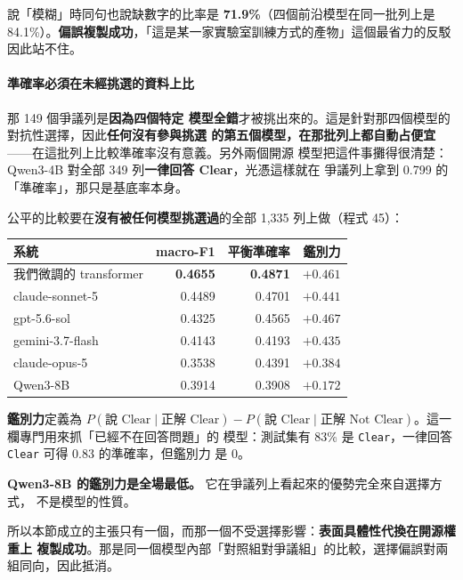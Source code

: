 \documentclass[11pt,a4paper]{ctexart}
\newcommand{\fn}[1]{\texttt{#1}}
\begin{document}
說「模糊」時同句也說缺數字的比率是 \textbf{71.9\%}（四個前沿模型在同一批列上是
84.1\%）。\textbf{偏誤複製成功}，「這是某一家實驗室訓練方式的產物」這個最省力的反駁
因此站不住。

\paragraph{準確率必須在未經挑選的資料上比} 那 149 個爭議列是\textbf{因為四個特定
模型全錯}才被挑出來的。這是針對那四個模型的對抗性選擇，因此\textbf{任何沒有參與挑選
的第五個模型，在那批列上都自動占便宜}——在這批列上比較準確率沒有意義。另外兩個開源
模型把這件事攤得很清楚：Qwen3-4B 對全部 349 列\textbf{一律回答 Clear}，光憑這樣就在
爭議列上拿到 0.799 的「準確率」，那只是基底率本身。

\medskip
公平的比較要在\textbf{沒有被任何模型挑選過}的全部 1{,}335 列上做（程式 45）：

\medskip
\begin{tabular}{@{}lrrr@{}}
\toprule
系統 & macro-F1 & 平衡準確率 & 鑑別力 \\
\midrule
\rowcolor{green!12}
我們微調的 transformer & \textbf{0.4655} & \textbf{0.4871} & $+0.461$ \\
claude-sonnet-5 & 0.4489 & 0.4701 & $+0.441$ \\
gpt-5.6-sol & 0.4325 & 0.4565 & $+0.467$ \\
gemini-3.7-flash & 0.4143 & 0.4193 & $+0.435$ \\
claude-opus-5 & 0.3538 & 0.4391 & $+0.384$ \\
\rowcolor{yellow!15}
Qwen3-8B & 0.3914 & 0.3908 & $\mathbf{+0.172}$ \\
\bottomrule
\end{tabular}

\medskip
\textbf{鑑別力}定義為 $P(\text{說 Clear} \mid \text{正解 Clear}) -
P(\text{說 Clear} \mid \text{正解 Not Clear})$。這一欄專門用來抓「已經不在回答問題」的
模型：測試集有 83\% 是 \fn{Clear}，一律回答 \fn{Clear} 可得 0.83 的準確率，但鑑別力
是 0。

\medskip
\begin{tcolorbox}[colback=gray!8, colframe=gray!55]
\textbf{Qwen3-8B 的鑑別力是全場最低。} 它在爭議列上看起來的優勢完全來自選擇方式，
不是模型的性質。

\medskip
所以本節成立的主張只有一個，而那一個不受選擇影響：\textbf{表面具體性代換在開源權重上
複製成功}。那是同一個模型內部「對照組對爭議組」的比較，選擇偏誤對兩組同向，因此抵消。
\end{tcolorbox}
\end{document}
